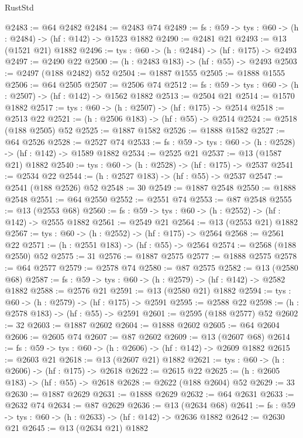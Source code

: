\begin{lexlean}{RustStd}
\begin{coremodule}
@2483 := @64 @2482
@2484 := @2483 @74
@2489 := {fs : @59} -> {tys : @60} -> (h : @2484) -> (hf : @142) -> @1523 @1882
@2490 := @2481 @21
@2493 := @13 (@1521 @21) @1882
@2496 := {tys : @60} -> (h : @2484) -> (hf : @175) -> @2493
@2497 := @2490 @22
@2500 := (h : @2483 @183) -> (hf : @55) -> @2493
@2503 := @2497 (@188 @2482) @52
@2504 := @1887 @1555
@2505 := @1888 @1555
@2506 := @64 @2505
@2507 := @2506 @74
@2512 := {fs : @59} -> {tys : @60} -> (h : @2507) -> (hf : @142) -> @1562 @1882
@2513 := @2504 @21
@2514 := @1570 @1882
@2517 := {tys : @60} -> (h : @2507) -> (hf : @175) -> @2514
@2518 := @2513 @22
@2521 := (h : @2506 @183) -> (hf : @55) -> @2514
@2524 := @2518 (@188 @2505) @52
@2525 := @1887 @1582
@2526 := @1888 @1582
@2527 := @64 @2526
@2528 := @2527 @74
@2533 := {fs : @59} -> {tys : @60} -> (h : @2528) -> (hf : @142) -> @1589 @1882
@2534 := @2525 @21
@2537 := @13 (@1587 @21) @1882
@2540 := {tys : @60} -> (h : @2528) -> (hf : @175) -> @2537
@2541 := @2534 @22
@2544 := (h : @2527 @183) -> (hf : @55) -> @2537
@2547 := @2541 (@188 @2526) @52
@2548 := 30
@2549 := @1887 @2548
@2550 := @1888 @2548
@2551 := @64 @2550
@2552 := @2551 @74
@2553 := @87 @2548
@2555 := @13 (@2553 @68)
@2560 := {fs : @59} -> {tys : @60} -> (h : @2552) -> (hf : @142) -> @2555 @1882
@2561 := @2549 @21
@2564 := @13 (@2553 @21) @1882
@2567 := {tys : @60} -> (h : @2552) -> (hf : @175) -> @2564
@2568 := @2561 @22
@2571 := (h : @2551 @183) -> (hf : @55) -> @2564
@2574 := @2568 (@188 @2550) @52
@2575 := 31
@2576 := @1887 @2575
@2577 := @1888 @2575
@2578 := @64 @2577
@2579 := @2578 @74
@2580 := @87 @2575
@2582 := @13 (@2580 @68)
@2587 := {fs : @59} -> {tys : @60} -> (h : @2579) -> (hf : @142) -> @2582 @1882
@2588 := @2576 @21
@2591 := @13 (@2580 @21) @1882
@2594 := {tys : @60} -> (h : @2579) -> (hf : @175) -> @2591
@2595 := @2588 @22
@2598 := (h : @2578 @183) -> (hf : @55) -> @2591
@2601 := @2595 (@188 @2577) @52
@2602 := 32
@2603 := @1887 @2602
@2604 := @1888 @2602
@2605 := @64 @2604
@2606 := @2605 @74
@2607 := @87 @2602
@2609 := @13 (@2607 @68)
@2614 := {fs : @59} -> {tys : @60} -> (h : @2606) -> (hf : @142) -> @2609 @1882
@2615 := @2603 @21
@2618 := @13 (@2607 @21) @1882
@2621 := {tys : @60} -> (h : @2606) -> (hf : @175) -> @2618
@2622 := @2615 @22
@2625 := (h : @2605 @183) -> (hf : @55) -> @2618
@2628 := @2622 (@188 @2604) @52
@2629 := 33
@2630 := @1887 @2629
@2631 := @1888 @2629
@2632 := @64 @2631
@2633 := @2632 @74
@2634 := @87 @2629
@2636 := @13 (@2634 @68)
@2641 := {fs : @59} -> {tys : @60} -> (h : @2633) -> (hf : @142) -> @2636 @1882
@2642 := @2630 @21
@2645 := @13 (@2634 @21) @1882

\end{coremodule}
\end{lexlean}

